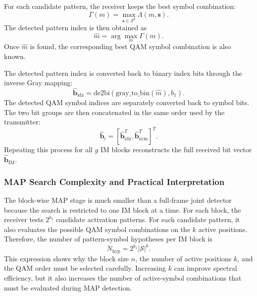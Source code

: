 For each candidate pattern, the receiver keeps the best symbol combination:
\begin{equation}
    \Gamma(m)
    =
    \max_{\mathbf{s}\in\mathcal{S}^{k}}
    \Lambda(m,\mathbf{s}).
    \label{eq:best_symbol_score}
\end{equation}
The detected pattern index is then obtained as
\begin{equation}
    \hat{m}
    =
    \arg\max_m
    \Gamma(m).
    \label{eq:detected_pattern_index}
\end{equation}
Once \(\hat{m}\) is found, the corresponding best QAM symbol combination is also known.

The detected pattern index is converted back to binary index bits through the inverse Gray mapping:
\begin{equation}
    \hat{\mathbf{b}}_{\mathrm{idx}}
    =
    \mathrm{de2bi}
    \left(
    \mathrm{gray\_to\_bin}(\hat{m}), b_1
    \right).
    \label{eq:receiver_index_bits}
\end{equation}
The detected QAM symbol indices are separately converted back to symbol bits. The two bit groups are then concatenated in the same order used by the transmitter:
\begin{equation}
    \hat{\mathbf{b}}_i
    =
    \left[
    \hat{\mathbf{b}}_{\mathrm{idx}}^{T},
    \hat{\mathbf{b}}_{\mathrm{sym}}^{T}
    \right]^{T}.
    \label{eq:receiver_block_bits}
\end{equation}
Repeating this process for all \(g\) IM blocks reconstructs the full received bit vector \(\hat{\mathbf{b}}_{\mathrm{IM}}\).

\subsubsection{MAP Search Complexity and Practical Interpretation}

The block-wise MAP stage is much smaller than a full-frame joint detector because the search is restricted to one IM block at a time. For each block, the receiver tests \(2^{b_1}\) candidate activation patterns. For each candidate pattern, it also evaluates the possible QAM symbol combinations on the \(k\) active positions. Therefore, the number of pattern-symbol hypotheses per IM block is
\begin{equation}
    N_{\mathrm{hyp}}
    =
    2^{b_1}
    |\mathcal{S}|^{k}.
    \label{eq:map_hypothesis_count}
\end{equation}
This expression shows why the block size \(n\), the number of active positions \(k\), and the QAM order must be selected carefully. Increasing \(k\) can improve spectral efficiency, but it also increases the number of active-symbol combinations that must be evaluated during MAP detection.

